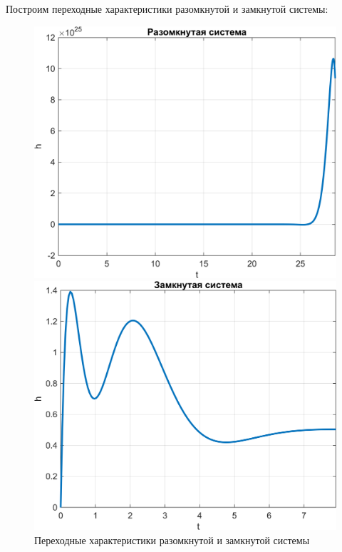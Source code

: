 Построим переходные характеристики разомкнутой и замкнутой системы:
\begin{figure}[H]
    \centering
    \begin{minipage}{0.45\textwidth}
        \centering
        \includegraphics[width=1\textwidth, trim={0cm 0cm 0cm 0cm}]{../images/1_3_h_ol.png}
    \end{minipage}
    \hfill
    \begin{minipage}{0.45\textwidth}
        \centering
        \includegraphics[width=1\textwidth, trim={0cm 0cm 0cm 0cm}]{../images/1_3_h_cl.png}
    \end{minipage}
    \caption{Переходные характеристики разомкнутой и замкнутой системы}
\end{figure}

